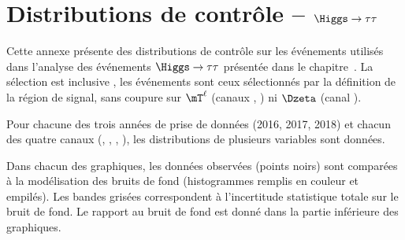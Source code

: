 \chapter{Distributions de contrôle -- $\Higgs\to\tau\tau$}\label{annexe-control_plots-HTT}

Cette annexe présente des distributions de contrôle
sur les événements utilisés dans l'analyse des événements $\Higgs\to\tau\tau$
présentée dans le chapitre~.
La sélection est \og inclusive \fg, les événements sont ceux sélectionnés par la définition de la région de signal,
sans coupure sur $\mT^{\ell}$ (canaux \mu\tauh, \ele\tauh) ni $\Dzeta$ (canal \ele\mu).
\par
Pour chacune des trois années de prise de données (2016, 2017, 2018)
et
chacun des quatre canaux (\tauh\tauh, \mu\tauh, \ele\tauh, \ele\mu),
les distributions de plusieurs variables sont données.
\par
Dans chacun des graphiques,
les données observées (points noirs) sont comparées à la modélisation des bruits de fond (histogrammes remplis en couleur et empilés).
Les bandes grisées correspondent à l'incertitude statistique totale sur le bruit de fond.
Le rapport au bruit de fond est donné dans la partie inférieure des graphiques.

\def\EMBFFchoice{emb_ff}

